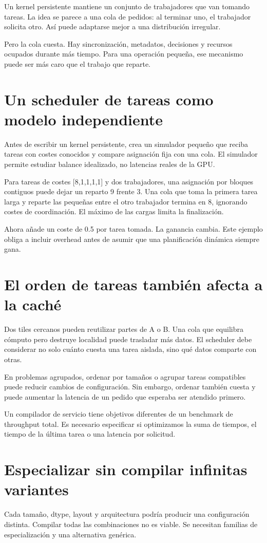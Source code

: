 \documentclass[12pt,a4paper,oneside]{report}
\begin{document}
Un kernel persistente mantiene un conjunto de trabajadores que van tomando tareas. La idea se parece a una cola de pedidos: al terminar uno, el trabajador solicita otro. Así puede adaptarse mejor a una distribución irregular.

Pero la cola cuesta. Hay sincronización, metadatos, decisiones y recursos ocupados durante más tiempo. Para una operación pequeña, ese mecanismo puede ser más caro que el trabajo que reparte.

\section{Un scheduler de tareas como modelo independiente}
Antes de escribir un kernel persistente, crea un simulador pequeño que reciba tareas con costes conocidos y compare asignación fija con una cola. El simulador permite estudiar balance idealizado, no latencias reales de la GPU.

Para tareas de costes [8,1,1,1,1] y dos trabajadores, una asignación por bloques contiguos puede dejar un reparto 9 frente 3. Una cola que toma la primera tarea larga y reparte las pequeñas entre el otro trabajador termina en 8, ignorando costes de coordinación. El máximo de las cargas limita la finalización.

Ahora añade un coste de 0.5 por tarea tomada. La ganancia cambia. Este ejemplo obliga a incluir overhead antes de asumir que una planificación dinámica siempre gana.

\section{El orden de tareas también afecta a la caché}
Dos tiles cercanos pueden reutilizar partes de A o B. Una cola que equilibra cómputo pero destruye localidad puede trasladar más datos. El scheduler debe considerar no solo cuánto cuesta una tarea aislada, sino qué datos comparte con otras.

En problemas agrupados, ordenar por tamaños o agrupar tareas compatibles puede reducir cambios de configuración. Sin embargo, ordenar también cuesta y puede aumentar la latencia de un pedido que esperaba ser atendido primero.

Un compilador de servicio tiene objetivos diferentes de un benchmark de throughput total. Es necesario especificar si optimizamos la suma de tiempos, el tiempo de la última tarea o una latencia por solicitud.

\section{Especializar sin compilar infinitas variantes}
Cada tamaño, dtype, layout y arquitectura podría producir una configuración distinta. Compilar todas las combinaciones no es viable. Se necesitan familias de especialización y una alternativa genérica.
\end{document}
